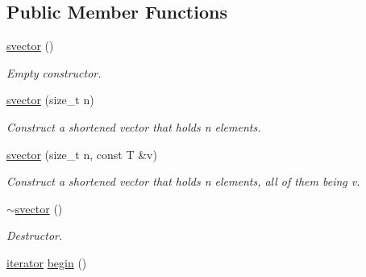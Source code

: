 \subsection*{Public Member Functions}
\begin{DoxyCompactItemize}
\item 
\mbox{\label{classlgraph_1_1utils_1_1svector_ae2587ed7933a70b8367e178dd61f90f9}} 
\hyperlink{classlgraph_1_1utils_1_1svector_ae2587ed7933a70b8367e178dd61f90f9}{svector} ()
\begin{DoxyCompactList}\small\item\em Empty constructor. \end{DoxyCompactList}\item 
\mbox{\label{classlgraph_1_1utils_1_1svector_aae71cfdb8e4d66c25a255b4a6bc7ad1c}} 
\hyperlink{classlgraph_1_1utils_1_1svector_aae71cfdb8e4d66c25a255b4a6bc7ad1c}{svector} (size\+\_\+t n)
\begin{DoxyCompactList}\small\item\em Construct a shortened vector that holds {\itshape n} elements. \end{DoxyCompactList}\item 
\mbox{\label{classlgraph_1_1utils_1_1svector_a350de4ad59381c976905881480b0ed05}} 
\hyperlink{classlgraph_1_1utils_1_1svector_a350de4ad59381c976905881480b0ed05}{svector} (size\+\_\+t n, const T \&v)
\begin{DoxyCompactList}\small\item\em Construct a shortened vector that holds {\itshape n} elements, all of them being {\itshape v}. \end{DoxyCompactList}\item 
\mbox{\label{classlgraph_1_1utils_1_1svector_a32558a0ffa1a78f192d4294e37922cbe}} 
\hyperlink{classlgraph_1_1utils_1_1svector_a32558a0ffa1a78f192d4294e37922cbe}{$\sim$svector} ()
\begin{DoxyCompactList}\small\item\em Destructor. \end{DoxyCompactList}\item 
\hyperlink{classlgraph_1_1utils_1_1svector_a518288794e754e27d2e2274ced4485a6}{iterator} \hyperlink{classlgraph_1_1utils_1_1svector_aeb8b316c538de8368b1efdbf7764ac91}{begin} ()

\end{DoxyCompactItemize}
